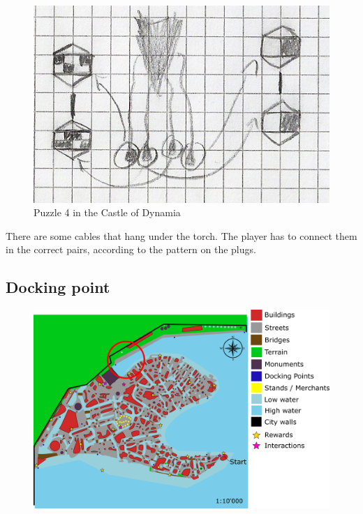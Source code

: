 \begin{figure}[H]
  \centering
  \includegraphics[width=\textwidth]{Images/Puzzles/castleOfDynamia_4}
  \caption{Puzzle 4 in the Castle of Dynamia}
\end{figure}

There are some cables that hang under the torch. The player has to connect them in the correct pairs, according to the pattern on the plugs.

\subsection{Docking point}
\begin{figure}[H]
    \centering
    \includegraphics[width=12cm]{Images/Maps/dockingPoint}
  \end{figure}
  
